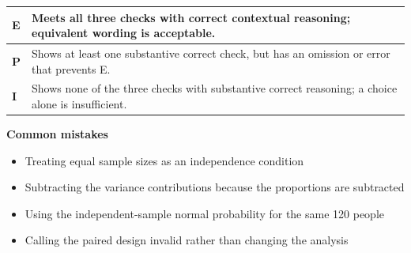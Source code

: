 \documentclass[11pt]{article}
\begin{document}
{\small\renewcommand{\arraystretch}{1.25}
\noindent\begin{tabular}{|p{0.5in}|p{5.9in}|}
\hline
\textbf{E} & Meets all three checks with correct contextual reasoning; equivalent wording is acceptable. \\ \hline
\textbf{P} & Shows at least one substantive correct check, but has an omission or error that prevents E. \\ \hline
\textbf{I} & Shows none of the three checks with substantive correct reasoning; a choice alone is insufficient. \\ \hline
\end{tabular}}

\textbf{Common mistakes}
\begin{itemize}[leftmargin=1.5em,itemsep=2pt,topsep=2pt]
  \item Treating equal sample sizes as an independence condition
  \item Subtracting the variance contributions because the proportions are subtracted
  \item Using the independent-sample normal probability for the same 120 people
  \item Calling the paired design invalid rather than changing the analysis
\end{itemize}

\clearpage
{}
\end{document}
